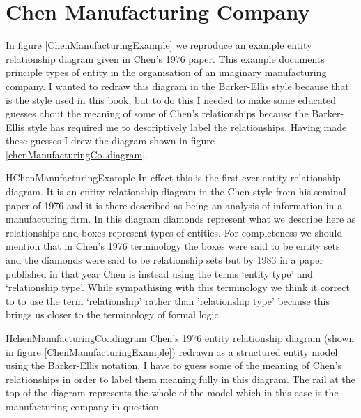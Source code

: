 \section{Chen Manufacturing Company}
\label{ChenManufacturingCompany}
In figure \ref{ChenManufacturingExample} we reproduce an example entity relationship diagram  given in Chen's 1976 paper. This example documents principle types of entity in the organisation of an imaginary manufacturing company.  I wanted to redraw
this diagram in the Barker-Ellis style because that is the style used in this book, but to do this I needed to make some educated guesses about the meaning of some of Chen's relationships because the Barker-Ellis style has required me to descriptively label the relationships. Having made these guesses I drew the diagram shown
 in figure \ref{chenManufacturingCo..diagram}. 

\begin{erboxedFigure} {H}{ChenManufacturingExample}{
In effect this is the first ever entity relationship diagram. It is an entity relationship diagram in the Chen style from his seminal paper of 1976 and it is there described as being an analysis of information in a manufacturing firm. In this diagram
diamonds represent what we describe here as relationships and boxes represent types of entities.  
For completeness we should mention that in Chen's 1976 terminology the boxes were said to be entity sets and the diamonds were said to be relationship sets but by 1983 in a paper published in that year Chen is instead using the terms `entity type' and `relationship type'. While sympathising with this terminology we think it correct to to use the term `relationship' rather than 'relationship type' because this brings us closer to the terminology of formal logic.
}
\begin{center}
\scalebox{0.80}{}
\end{center}
\end{erboxedFigure}

\begin{erboxedFigure} {H}{chenManufacturingCo..diagram}{
Chen's 1976 entity relationship diagram (shown in figure \ref{ChenManufacturingExample}) 
redrawn as a structured entity model using the Barker-Ellis notation. 
I have to guess some of the meaning of Chen's relationships in order to label them meaning fully in
 this diagram. 
 The rail at the top of the diagram represents the whole of the model which in this case is the manufacturing company in question.
}
\begin{center}
\scalebox{0.95}{}
\end{center}
\end{erboxedFigure}

